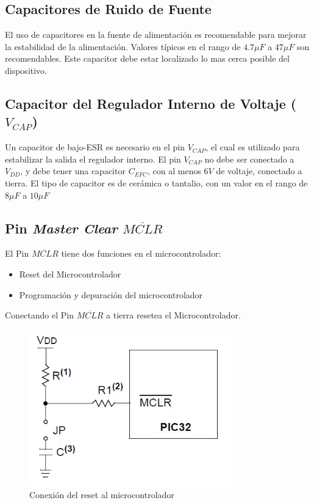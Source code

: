 \documentclass[12pt,letterpaper,twoside]{book}
\begin{document}
\subsection{Capacitores de Ruido de Fuente}

El uso de capacitores en la fuente de alimentación es recomendable para mejorar la estabilidad de la alimentación. Valores típicos en el rango de $4.7 \mu F$ a $47 \mu F$ son recomendables. Este capacitor debe estar localizado lo mas cerca posible del dispositivo.

\subsection{Capacitor del Regulador Interno de Voltaje ($V_{CAP}$)}

Un capacitor de bajo-ESR es necesario en el pin $V_{CAP}$, el cual es utilizado para estabilizar la salida el regulador interno. El pin $V_{CAP}$ no debe ser conectado a $V_{DD}$, y debe tener una capacitor $C_{EFC}$, con al menos $6V$ de voltaje, conectado a tierra. El tipo de capacitor es de cerámica o tantalio, con un valor en el rango de $8 \mu F$ a $10 \mu F$

\subsection{Pin \emph{Master Clear} $\overline{MCLR}$}

El Pin $\overline{MCLR}$ tiene dos funciones en el microcontrolador:
\begin{itemize}
\item Reset del Microcontrolador
\item Programación y depuración del microcontrolador
\end{itemize}

Conectando el Pin $\overline{MCLR}$ a tierra resetea el Microcontrolador. 


\begin{figure}
\centering
\includegraphics[width=3.5in]{reset.jpg}
\caption{Conexión del reset al microcontrolador}
\label{fig8}
\end{figure}
\end{document}
